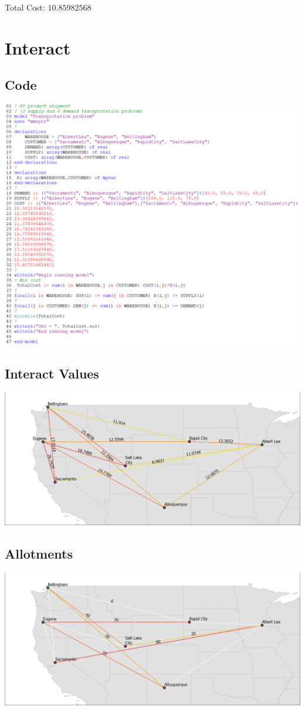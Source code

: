 \documentclass[12pt]{article}
\theoremstyle{definition}
\begin{document}
Total Cost: $10.85982568$

\newpage
\section{Interact}
\subsection{Code}
\includegraphics[width=\textwidth]{codeint.png}
\newpage
\subsection{Interact Values}
\includegraphics[width=\textwidth]{mapint.png}
\subsection{Allotments}
\includegraphics[width=\textwidth]{solmapcost.png}
\end{document}

